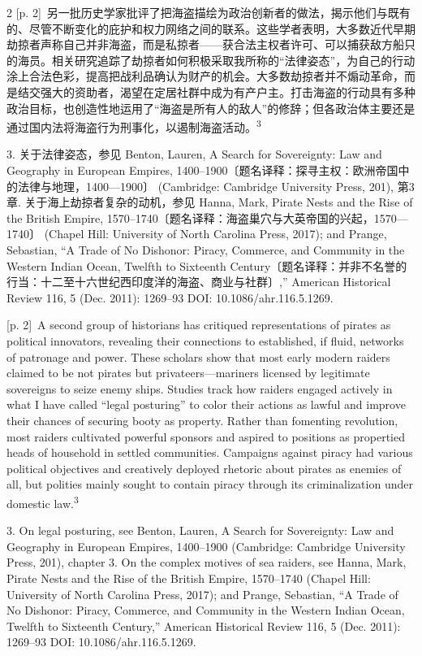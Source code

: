 \documentclass[10pt,a4paper]{article}
\begin{document}
\begin{paracol}{2}
{\scriptsize\color{gray} [p. 2]}\ 另一批历史学家批评了把海盗描绘为政治创新者的做法，揭示他们与既有的、尽管不断变化的庇护和权力网络之间的联系。这些学者表明，大多数近代早期劫掠者声称自己并非海盗，而是私掠者——获合法主权者许可、可以捕获敌方船只的海员。相关研究追踪了劫掠者如何积极采取我所称的“法律姿态”，为自己的行动涂上合法色彩，提高把战利品确认为财产的机会。大多数劫掠者并不煽动革命，而是结交强大的资助者，渴望在定居社群中成为有产户主。打击海盗的行动具有多种政治目标，也创造性地运用了“海盗是所有人的敌人”的修辞；但各政治体主要还是通过国内法将海盗行为刑事化，以遏制海盗活\mbox{动。\textsuperscript{3}}\par{\small 3. 关于法律姿态，参见 Benton, Lauren, A Search for Sovereignty: Law and Geography in European Empires, 1400–1900〔题名译释：探寻主权：欧洲帝国中的法律与地理，1400—1900〕 (Cambridge: Cambridge University Press, 201), 第3章. 关于海上劫掠者复杂的动机，参见 Hanna, Mark, Pirate Nests and the Rise of the British Empire, 1570–1740〔题名译释：海盗巢穴与大英帝国的兴起，1570—1740〕 (Chapel Hill: University of North Carolina Press, 2017); and Prange, Sebastian, “A Trade of No Dishonor: Piracy, Commerce, and Community in the Western Indian Ocean, Twelfth to Sixteenth Century〔题名译释：并非不名誉的行当：十二至十六世纪西印度洋的海盗、商业与社群〕,” American Historical Review 116, 5 (Dec. 2011): 1269–93 DOI: 10.1086/ahr.116.5.1269.\par}
\switchcolumn
{\scriptsize\color{gray} [p. 2]}\ A second group of historians has critiqued representations of pirates as political innovators, revealing their connections to established, if fluid, networks of patronage and power. These scholars show that most early modern raiders claimed to be not pirates but privateers—mariners licensed by legitimate sovereigns to seize enemy ships. Studies track how raiders engaged actively in what I have called “legal posturing” to color their actions as lawful and improve their chances of securing booty as property. Rather than fomenting revolution, most raiders cultivated powerful sponsors and aspired to positions as propertied heads of household in settled communities. Campaigns against piracy had various political objectives and creatively deployed rhetoric about pirates as enemies of all, but polities mainly sought to contain piracy through its criminalization under domestic law.\nobreak\textsuperscript{3}\par{\small 3. On legal posturing, see Benton, Lauren, A Search for Sovereignty: Law and Geography in European Empires, 1400–1900 (Cambridge: Cambridge University Press, 201), chapter 3. On the complex motives of sea raiders, see Hanna, Mark, Pirate Nests and the Rise of the British Empire, 1570–1740 (Chapel Hill: University of North Carolina Press, 2017); and Prange, Sebastian, “A Trade of No Dishonor: Piracy, Commerce, and Community in the Western Indian Ocean, Twelfth to Sixteenth Century,” American Historical Review 116, 5 (Dec. 2011): 1269–93 DOI: 10.1086/ahr.116.5.1269.\par}

\end{paracol}
\end{document}
